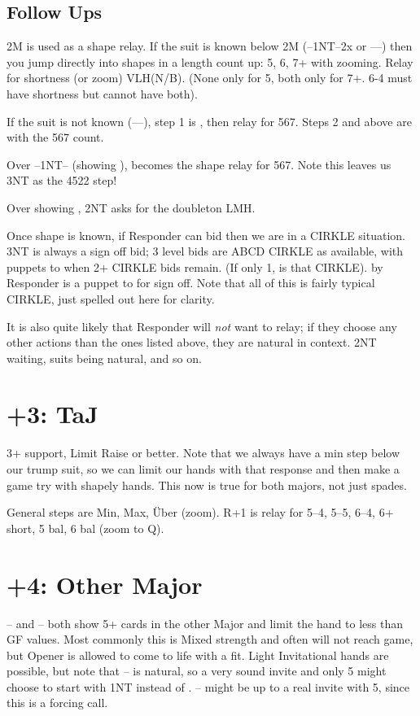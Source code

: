 \documentclass[tom-ari]{subfile}
\begin{document}
	\subsection{Follow Ups}
	
	2M is used as a shape relay.  If the suit is known below 2M (--1NT--2x or ----) then you jump directly into shapes in a length count up:  5, 6, 7+ with zooming. Relay for shortness (or zoom) VLH(N/B). (None only for 5, both only for 7+.  6-4 must have shortness but cannot have both).
	
	If the suit is not known (----), step 1 is \ccc, then relay for 567.  Steps 2 and above are \ddd with the 567 count.
	
	Over --1NT-- (showing \sss),  becomes the shape relay for 567.  Note this leaves us 3NT as the 4522 step!
	
	Over  showing , 2NT asks for the doubleton LMH.  
	
	Once shape is known, if Responder can bid  then we are in a CIRKLE situation.  3NT is always a sign off bid; 3 level bids are ABCD CIRKLE as available, with  puppets to  when 2+ CIRKLE bids remain. (If only 1,  is that CIRKLE).   by Responder is a puppet to  for sign off.  Note that all of this is fairly typical CIRKLE, just spelled out here for clarity.
	
	It is also quite likely that Responder will \textit{not} want to relay; if they choose any other actions than the ones listed above, they are natural in context.  2NT waiting, suits being natural, and so on.
	
	\section{+3: TaJ}
	
	3+ support, Limit Raise or better.  Note that we always have a min step below our trump suit, so we can limit our hands with that response and then make a game try with shapely hands.  This now is true for both majors, not just spades.
	
	General steps are Min, Max, \"Uber (zoom). R+1 is relay for 5--4, 5--5, 6--4, 6+ short, 5 bal, 6 bal (zoom to Q).
	
	\section{+4: Other Major}
	
	-- and -- both show 5+ cards in the other Major and limit the hand to less than GF values.  Most commonly this is Mixed strength and often will not reach game, but Opener is allowed to come to life with a fit.  Light Invitational hands are possible, but note that -- is natural, so a very sound invite and only 5  might choose to start with 1NT instead of .  -- might be up to a real invite with 5, since this is a forcing call.
\end{document}
